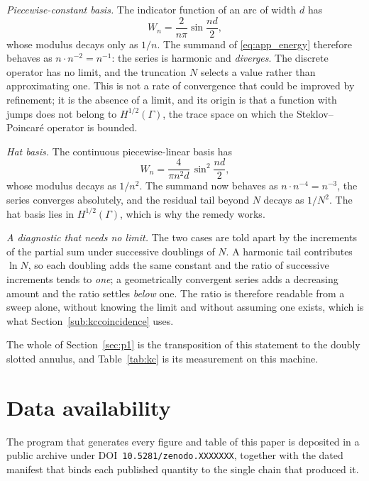 \documentclass[10pt,a4paper,twocolumn]{article}
\theoremstyle{plain}
\theoremstyle{remark}
\begin{document}
\emph{Piecewise-constant basis.} The indicator function of an arc of
width $d$ has
\begin{equation}
W_n=\frac{2}{n\pi}\sin\frac{nd}{2},
\label{eq:app_p0}
\end{equation}
whose modulus decays only as $1/n$. The summand of
\eqref{eq:app_energy} therefore behaves as $n\cdot n^{-2}=n^{-1}$: the
series is harmonic and \emph{diverges}. The discrete operator has no
limit, and the truncation $N$ selects a value rather than approximating
one. This is not a rate of convergence that could be improved by
refinement; it is the absence of a limit, and its origin is that a
function with jumps does not belong to $H^{1/2}(\Gamma)$, the trace
space on which the Steklov--Poincar\'e operator is bounded.

\emph{Hat basis.} The continuous piecewise-linear basis has
\begin{equation}
W_n=\frac{4}{\pi n^{2}d}\,\sin^{2}\frac{nd}{2},
\label{eq:app_p1}
\end{equation}
whose modulus decays as $1/n^{2}$. The summand now behaves as
$n\cdot n^{-4}=n^{-3}$, the series converges absolutely, and the
residual tail beyond $N$ decays as $1/N^{2}$. The hat basis lies in
$H^{1/2}(\Gamma)$, which is why the remedy works.

\emph{A diagnostic that needs no limit.} The two cases are told apart by
the increments of the partial sum under successive doublings of $N$.
A harmonic tail contributes $\ln N$, so each doubling adds the same
constant and the ratio of successive increments tends to \emph{one}; a
geometrically convergent series adds a decreasing amount and the ratio
settles \emph{below} one. The ratio is therefore readable from a sweep
alone, without knowing the limit and without assuming one exists, which
is what Section~\ref{sub:kccoincidence} uses.

The whole of Section~\ref{sec:p1} is the transposition of this
statement to the doubly slotted annulus, and Table~\ref{tab:kc} is its
measurement on this machine.


\section*{Data availability}
The program that generates every figure and table of this paper is
deposited in a public archive under
DOI~\texttt{10.5281/zenodo.XXXXXXX}, together with the dated manifest
that binds each published quantity to the single chain that produced
it.



\end{document}
